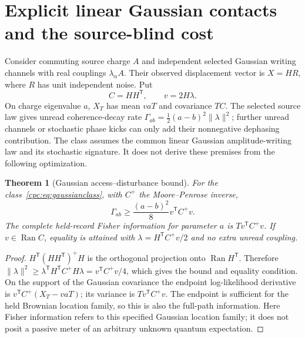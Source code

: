 \documentclass[11pt,oneside,openany]{book}
\newtheorem{theorem}{Theorem}[chapter]
\theoremstyle{definition}
\theoremstyle{remark}\newtheorem{remark}[theorem]{Remark}
\begin{document}
\section{Explicit linear Gaussian contacts and the source-blind cost}

Consider commuting source charge $A$ and independent selected Gaussian writing channels with real couplings $\lambda_\alpha A$. Their observed displacement vector is $X=HR$, where $R$ has unit independent noise. Put
\begin{equation}
 C=HH^{\mathsf T},\qquad v=2H\lambda.
 \label{cpc:eq:gaussianclass}
\end{equation}
On charge eigenvalue $a$, $X_T$ has mean $vaT$ and covariance $TC$. The selected source law gives unread coherence-decay rate
$\Gamma_{ab}=\tfrac12(a-b)^2\|\lambda\|^2$; further unread channels or stochastic phase kicks can only add their nonnegative dephasing contribution. The class assumes the common linear Gaussian amplitude-writing law and its stochastic signature. It does not derive these premises from the following optimization.

\begin{theorem}[Gaussian access--disturbance bound]
\label{cpc:thm:gaussianbound}
For the class~\eqref{cpc:eq:gaussianclass}, with $C^+$ the Moore--Penrose inverse,
\begin{equation}
 \Gamma_{ab}\ge\frac{(a-b)^2}{8}v^{\mathsf T}C^+v.
 \label{cpc:eq:gaussianbound}
\end{equation}
The complete held-record Fisher information for parameter $a$ is $T v^{\mathsf T}C^+v$. If $v\in\operatorname{Ran}C$, equality is attained with $\lambda=H^{\mathsf T}C^+v/2$ and no extra unread coupling.
\end{theorem}
\begin{proof}
$H^{\mathsf T}(HH^{\mathsf T})^+H$ is the orthogonal projection onto $\operatorname{Ran}H^{\mathsf T}$. Therefore
$\|\lambda\|^2\ge\lambda^{\mathsf T}H^{\mathsf T}C^+H\lambda=v^{\mathsf T}C^+v/4$,
which gives the bound and equality condition. On the support of the Gaussian covariance the endpoint log-likelihood derivative is $v^{\mathsf T}C^+(X_T-vaT)$; its variance is $Tv^{\mathsf T}C^+v$. The endpoint is sufficient for the held Brownian location family, so this is also the full-path information. Here Fisher information refers to this specified Gaussian location family; it does not posit a passive meter of an arbitrary unknown quantum expectation.
\end{proof}
\end{document}
